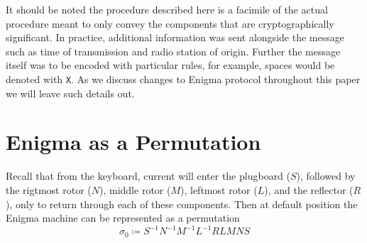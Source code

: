 \noindent It should be noted the procedure described here is a
facimile of the actual procedure meant to only convey the components
that are cryptographically significant. In practice, additional
information was sent alongside the message such as time of
transmission and radio station of origin. Further the message itself
was to be encoded with particular rules, for example, spaces would be
denoted with \texttt{X}. As we discuss changes to Enigma protocol
throughout this paper we will leave such details out.


\section{Enigma as a Permutation}

Recall that from the keyboard, current will enter the plugboard
($S$), followed by the rigtmost rotor ($N$), middle
rotor ($M$), leftmost rotor ($L$), and the reflector ($R$), only to
return through each of these components. Then at default position the
Enigma machine can be represented as a permutation
\[
	\sigma_0 \coloneq S^{-1}N^{-1}M^{-1}L^{-1}RLMNS
\]

